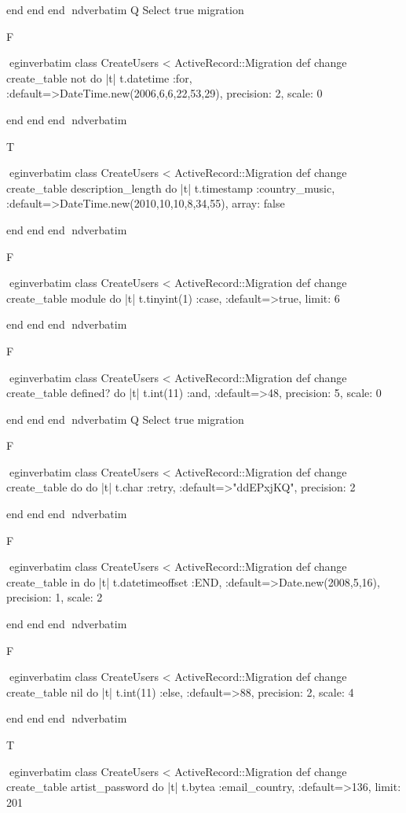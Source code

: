     end 
  end 
end
nd{verbatim}
Q
 Select true migration

F

egin{verbatim}
 class CreateUsers < ActiveRecord::Migration 
  def change 
    create_table not do |t| 
      t.datetime :for, :default=>DateTime.new(2006,6,6,22,53,29), precision: 2, scale: 0
    
    end 
  end 
end
nd{verbatim}

T

egin{verbatim}
 class CreateUsers < ActiveRecord::Migration 
  def change 
    create_table description_length do |t| 
      t.timestamp :country_music, :default=>DateTime.new(2010,10,10,8,34,55), array: false
    
    end 
  end 
end
nd{verbatim}

F

egin{verbatim}
 class CreateUsers < ActiveRecord::Migration 
  def change 
    create_table module do |t| 
      t.tinyint(1) :case, :default=>true, limit: 6
    
    end 
  end 
end
nd{verbatim}

F

egin{verbatim}
 class CreateUsers < ActiveRecord::Migration 
  def change 
    create_table defined? do |t| 
      t.int(11) :and, :default=>48, precision: 5, scale: 0
    
    end 
  end 
end
nd{verbatim}
Q
 Select true migration

F

egin{verbatim}
 class CreateUsers < ActiveRecord::Migration 
  def change 
    create_table do do |t| 
      t.char :retry, :default=>"ddEPxjKQ", precision: 2
    
    end 
  end 
end
nd{verbatim}

F

egin{verbatim}
 class CreateUsers < ActiveRecord::Migration 
  def change 
    create_table in do |t| 
      t.datetimeoffset :END, :default=>Date.new(2008,5,16), precision: 1, scale: 2
    
    end 
  end 
end
nd{verbatim}

F

egin{verbatim}
 class CreateUsers < ActiveRecord::Migration 
  def change 
    create_table nil do |t| 
      t.int(11) :else, :default=>88, precision: 2, scale: 4
    
    end 
  end 
end
nd{verbatim}

T

egin{verbatim}
 class CreateUsers < ActiveRecord::Migration 
  def change 
    create_table artist_password do |t| 
      t.bytea :email_country, :default=>136, limit: 201
    
